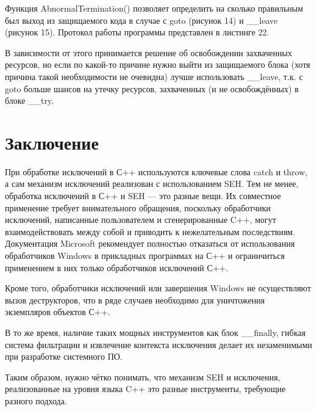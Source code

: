 \documentclass[a4paper, 12pt]{report}		%
\begin{document}
Функция AbnormalTermination() позволяет определить на сколько правильным был выход из защищаемого кода в случае с goto (рисунок 14) и \_\_leave (рисунок 15). Протокол работы программы представлен в листинге 22.

В зависимости от этого принимается решение об освобождении захваченных ресурсов, но если по какой-то причине нужно выйти из защищаемого блока (хотя причина такой необходимости не очевидна) лучше использовать \_\_leave, т.к. с goto больше шансов на утечку ресурсов, захваченных (и не освобождённых) в блоке \_\_try.




\chapter*{Заключение}

\vspace{3em}
При обработке исключений в С++ используются ключевые слова catch и throw, а сам механизм исключений реализован с использованием SEH. Тем не менее, обработка исключений в С++ и SEH — это разные вещи. Их совместное применение требует внимательного обращения, поскольку обработчики исключений, написанные пользователем и сгенерированные C++, могут взаимодействовать между собой и приводить к нежелательным последствиям. Документация Microsoft рекомендует полностью отказаться от использования обработчиков Windows в прикладных программах на С++ и ограничиться применением в них только обработчиков исключений С++.

\vspace{2em}
Кроме того, обработчики исключений или завершения Windows не осуществляют вызов деструкторов, что в ряде случаев необходимо для уничтожения экземпляров объектов С++.

\vspace{2em}
В то же время, наличие таких мощных инструментов как блок \_\_finally, гибкая система фильтрации и извлечение контекста исключения делает их незаменимыми при разработке системного ПО.

\vspace{2em}
Таким образом, нужно чётко понимать, что механизм SEH и исключения, реализованные на уровня языка C++ это разные инструменты, требующие разного подхода.
\end{document}
